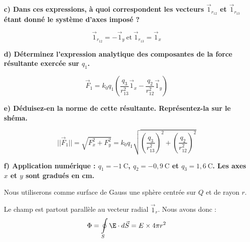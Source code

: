 \documentclass[british,french,11pt, a4paper, openany]{book}
\begin{document}
		\textbf{c) Dans ces expressions, à quoi correspondent les vecteurs $\vec 1_{r_{12}}$ et $\vec 1_{r_{13}}$ étant donné le système d'axes imposé ?}
			
		$$\vec 1_{r_{12}} = - \vec 1_y\ \text{et}\ \vec 1_{r_{13}} = \vec 1_x$$
			
		\textbf{d) Déterminez l'expression analytique des composantes de la force résultante exercée sur $q_1$.}
			
		$$\vec F_1 = k_0 q_1 \left( \dfrac{q_3}{r_{13}^2} \vec 1_x - \dfrac{q_2}{r_{12}^2} \vec 1_y \right)$$
			
		\textbf{e) Déduisez-en la norme de cette résultante. Représentez-la sur le shéma.}
			
		$$||\vec F_1|| = \sqrt{F_x^2 + F_y^2} = k_0 q_1 \sqrt{ \left( \dfrac{q_3}{r_{13}^2} \right)^2 + \left(  \dfrac{q_2}{r_{12}^2} \right)^2 }$$
			
		\textbf{f) Application numérique : $q_1 = -1\ \text{C}$, $q_2 = -0,9\ \text{C}$ et $q_3 = 1,6\ \text{C}$. Les axes $x$ et $y$ sont gradués en cm.}
		
		
		\vspace{0,5cm}
		
			
		Nous utiliserons comme surface de Gauss une sphère centrée sur $Q$ et de rayon $r$.
			
		Le champ est partout parallèle au vecteur radial $\vec 1_r$. Nous avons donc : $$ \Phi = \oint  \limits_S \E \cdot d \vec S = E \times 4\pi r^2 $$
			
\end{document}
